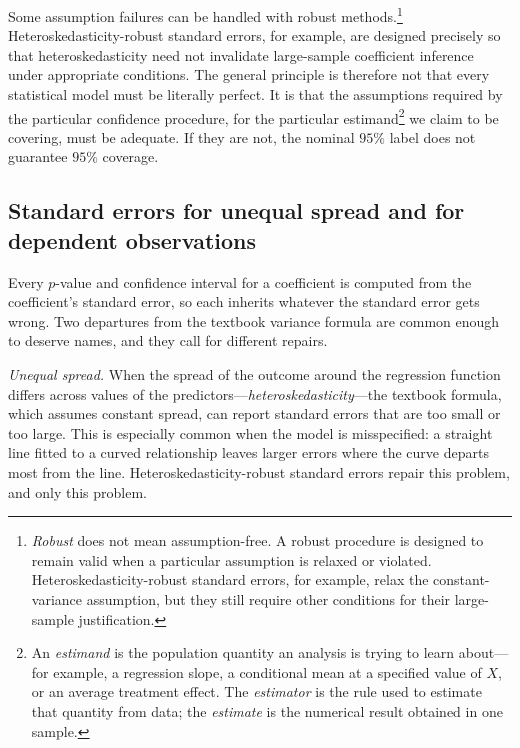 \documentclass[11pt]{report}
\begin{document}
Some assumption failures can be handled with robust methods.\footnote{\emph{Robust} does not mean assumption-free. A robust procedure is designed to remain valid when a particular assumption is relaxed or violated. Heteroskedasticity-robust standard errors, for example, relax the constant-variance assumption, but they still require other conditions for their large-sample justification.} Heteroskedasticity-robust standard errors, for example, are designed precisely so that heteroskedasticity need not invalidate large-sample coefficient inference under appropriate conditions. The general principle is therefore not that every statistical model must be literally perfect. It is that the assumptions required by the particular confidence procedure, for the particular estimand\footnote{An \emph{estimand} is the population quantity an analysis is trying to learn about---for example, a regression slope, a conditional mean at a specified value of \(X\), or an average treatment effect. The \emph{estimator} is the rule used to estimate that quantity from data; the \emph{estimate} is the numerical result obtained in one sample.} we claim to be covering, must be adequate. If they are not, the nominal \(95\%\) label does not guarantee \(95\%\) coverage.

\subsection{Standard errors for unequal spread and for dependent observations}
\label{sec:robust_clustered}

Every \(p\)-value and confidence interval for a coefficient is computed from the coefficient's standard error, so each inherits whatever the standard error gets wrong. Two departures from the textbook variance formula are common enough to deserve names, and they call for different repairs.

\emph{Unequal spread.} When the spread of the outcome around the regression function differs across values of the predictors---\emph{heteroskedasticity}---the textbook formula, which assumes constant spread, can report standard errors that are too small or too large. This is especially common when the model is misspecified: a straight line fitted to a curved relationship leaves larger errors where the curve departs most from the line. Heteroskedasticity-robust standard errors repair this problem, and only this problem.
\end{document}
